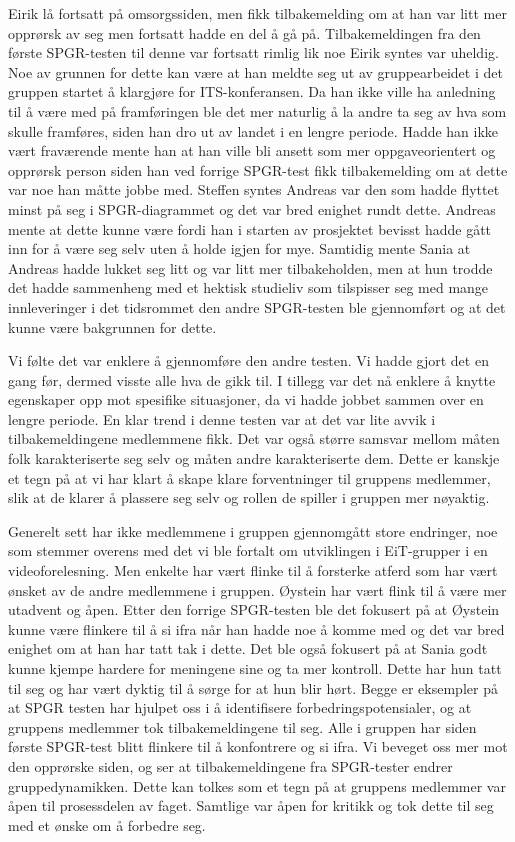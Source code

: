 \documentclass[a4paper,norsk,oneside]{article}
\begin{document}
Eirik lå fortsatt på omsorgssiden, men fikk tilbakemelding om at han var litt mer opprørsk av seg men fortsatt hadde en del å gå på. Tilbakemeldingen fra den første SPGR-testen til denne var fortsatt rimlig lik noe Eirik syntes var uheldig. Noe av grunnen for dette kan være at han meldte seg ut av gruppearbeidet i det gruppen startet å klargjøre for ITS-konferansen. Da han ikke ville ha anledning til å være med på framføringen ble det mer naturlig å la andre ta seg av hva som skulle framføres, siden han dro ut av landet i en lengre periode. Hadde han ikke vært fraværende mente han at han ville bli ansett som mer oppgaveorientert og opprørsk person siden han ved forrige SPGR-test fikk tilbakemelding om at dette var noe han måtte jobbe med. 
Steffen syntes Andreas var den som hadde flyttet minst på seg i SPGR-diagrammet og det var bred enighet rundt dette. Andreas mente at dette kunne være fordi han i starten av prosjektet bevisst hadde gått inn for å være seg selv uten å holde igjen for mye. Samtidig mente Sania at Andreas hadde lukket seg litt og var litt mer tilbakeholden, men at hun trodde det hadde sammenheng med et hektisk studieliv som tilspisser seg med mange innleveringer i det tidsrommet den andre SPGR-testen ble gjennomført og at det kunne være bakgrunnen for dette.

Vi følte det var enklere å gjennomføre den andre testen. Vi hadde gjort det en gang før, dermed visste alle hva de gikk til. I tillegg var det nå enklere å knytte egenskaper opp mot spesifike situasjoner, da vi hadde jobbet sammen over en lengre periode. En klar trend i denne testen var at det var lite avvik i tilbakemeldingene medlemmene fikk. Det var også større samsvar mellom måten folk karakteriserte seg selv og måten andre karakteriserte dem. Dette er kanskje et tegn på at vi har klart å skape klare forventninger til gruppens medlemmer, slik at de klarer å plassere seg selv og rollen de spiller i gruppen mer nøyaktig.

Generelt sett har ikke medlemmene i gruppen gjennomgått store endringer, noe som stemmer overens med det vi ble fortalt om utviklingen i EiT-grupper i en videoforelesning. Men enkelte har vært flinke til å forsterke atferd som har vært ønsket av de andre medlemmene i gruppen. Øystein har vært flink til å være mer utadvent og åpen. Etter den forrige SPGR-testen ble det fokusert på at Øystein kunne være flinkere til å si ifra når han hadde noe å komme med og det var bred enighet om at han har tatt tak i dette. Det ble også fokusert på at Sania godt kunne kjempe hardere for meningene sine og ta mer kontroll. Dette har hun tatt til seg og har vært dyktig til å sørge for at hun blir hørt. Begge er eksempler på at SPGR testen har hjulpet oss i å identifisere forbedringspotensialer, og at gruppens medlemmer tok tilbakemeldingene til seg. Alle i gruppen har siden første SPGR-test blitt flinkere til å konfontrere og si ifra. Vi beveget oss mer mot den opprørske siden, og ser at tilbakemeldingene fra SPGR-tester endrer gruppedynamikken. Dette kan tolkes som et tegn på at gruppens medlemmer var åpen til prosessdelen av faget. Samtlige var åpen for kritikk og tok dette til seg med et ønske om å forbedre seg.
\end{document}
